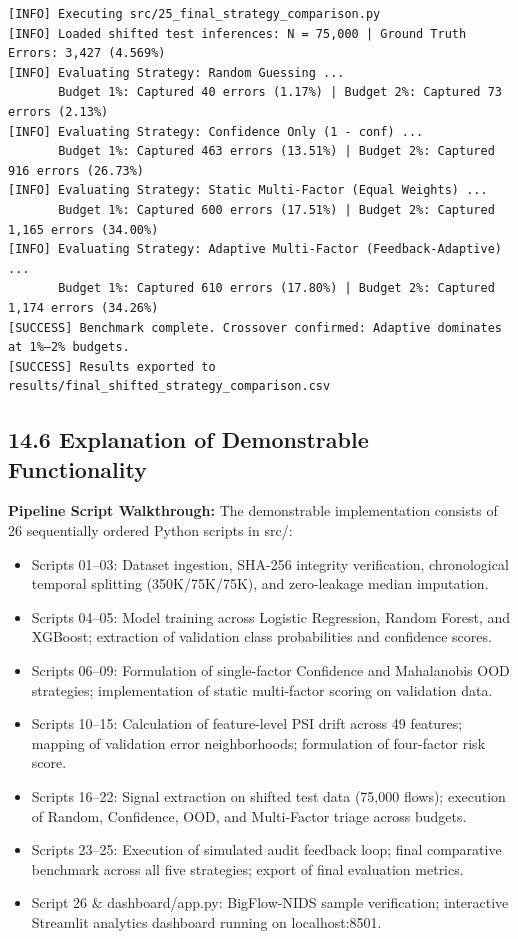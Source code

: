 \begin{verbatim}
[INFO] Executing src/25_final_strategy_comparison.py
[INFO] Loaded shifted test inferences: N = 75,000 | Ground Truth Errors: 3,427 (4.569%)
[INFO] Evaluating Strategy: Random Guessing ...
       Budget 1%: Captured 40 errors (1.17%) | Budget 2%: Captured 73 errors (2.13%)
[INFO] Evaluating Strategy: Confidence Only (1 - conf) ...
       Budget 1%: Captured 463 errors (13.51%) | Budget 2%: Captured 916 errors (26.73%)
[INFO] Evaluating Strategy: Static Multi-Factor (Equal Weights) ...
       Budget 1%: Captured 600 errors (17.51%) | Budget 2%: Captured 1,165 errors (34.00%)
[INFO] Evaluating Strategy: Adaptive Multi-Factor (Feedback-Adaptive) ...
       Budget 1%: Captured 610 errors (17.80%) | Budget 2%: Captured 1,174 errors (34.26%)
[SUCCESS] Benchmark complete. Crossover confirmed: Adaptive dominates at 1%–2% budgets.
[SUCCESS] Results exported to results/final_shifted_strategy_comparison.csv
\end{verbatim}

\subsection{14.6 Explanation of Demonstrable Functionality}

\textbf{Pipeline Script Walkthrough:} The demonstrable implementation consists of 26 sequentially ordered Python scripts in src/:

\begin{itemize}
\item Scripts 01--03: Dataset ingestion, SHA-256 integrity verification, chronological temporal splitting (350K/75K/75K), and zero-leakage median imputation.
\item Scripts 04--05: Model training across Logistic Regression, Random Forest, and XGBoost; extraction of validation class probabilities and confidence scores.
\item Scripts 06--09: Formulation of single-factor Confidence and Mahalanobis OOD strategies; implementation of static multi-factor scoring on validation data.
\item Scripts 10--15: Calculation of feature-level PSI drift across 49 features; mapping of validation error neighborhoods; formulation of four-factor risk score.
\item Scripts 16--22: Signal extraction on shifted test data (75,000 flows); execution of Random, Confidence, OOD, and Multi-Factor triage across budgets.
\item Scripts 23--25: Execution of simulated audit feedback loop; final comparative benchmark across all five strategies; export of final evaluation metrics.
\item Script 26 \& dashboard/app.py: BigFlow-NIDS sample verification; interactive Streamlit analytics dashboard running on localhost:8501.
\end{itemize}

